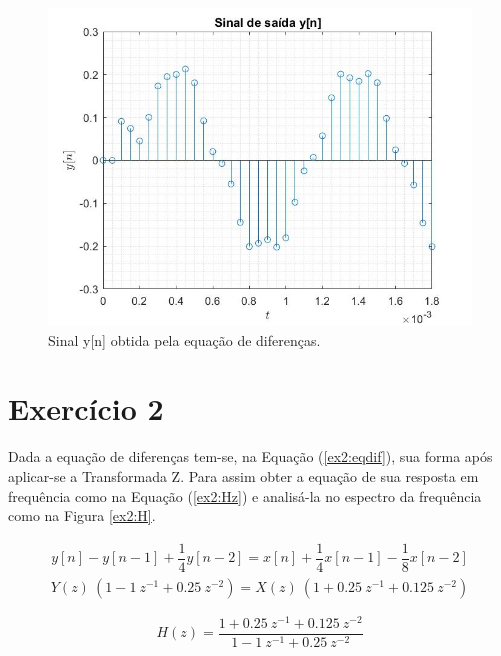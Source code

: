 \documentclass[a4paper,12pt,oneside,openany,table,xcdraw]{article}
\begin{document}
\vspace{0.2cm}
\begin{figure}[H]
\centering
\includegraphics[width=14cm]{ex1_yn}
\caption{Sinal y[n] obtida pela equação de diferenças.}
\label{ex1:yn}
\end{figure}


\vspace{0.5cm}
\section{Exercício 2}
Dada a equação de diferenças tem-se, na Equação (\ref{ex2:eqdif}), sua forma após aplicar-se a Transformada Z. Para assim obter a equação de sua resposta em frequência como na Equação (\ref{ex2:Hz}) e analisá-la no espectro da frequência como na Figura \ref{ex2:H}.

\begin{gather} 
y[n] - y[n-1] + \dfrac{1}{4} y[n-2] = x[n] +\dfrac{1}{4} x[n-1] -\dfrac{1}{8} x[n-2] \label{ex2:eqdif} 
\end{gather}
\begin{gather} 
Y(z)\ (1 - 1\ z^{-1} + 0.25\ z^{-2}) = X(z)\ (1 + 0.25\ z^{-1} + 0.125\ z^{-2})
\end{gather}

\begin{equation} \label{ex2:Hz}
H(z) = \dfrac{1 + 0.25\ z^{-1} + 0.125\ z^{-2}}{1 - 1\ z^{-1} + 0.25\ z^{-2}}
\end{equation}
\end{document}
